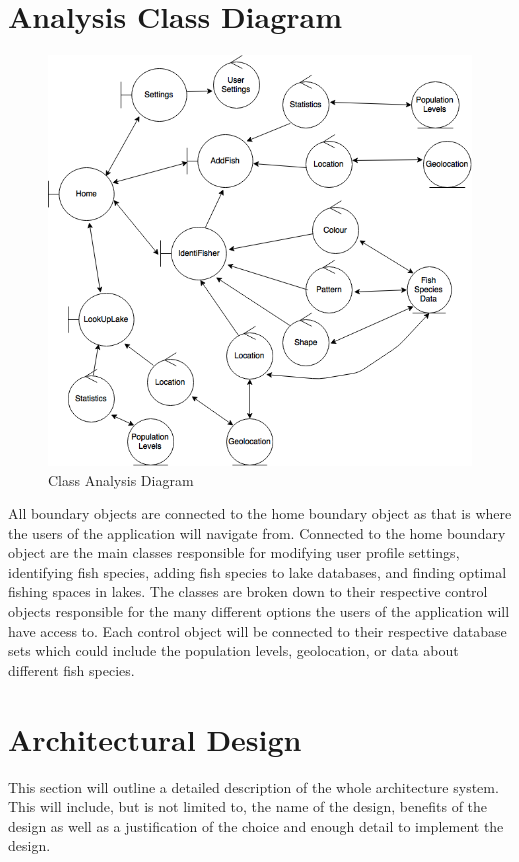 \documentclass[]{article}
\begin{document}
\section{Analysis Class Diagram}
\label{sec:analysis_class_diagram}
\begin{figure}
\includegraphics[width=\textwidth]{classAnalysis}
\caption{Class Analysis Diagram}
\end{figure}

\FloatBarrier

All boundary objects are connected to the home boundary object as that is where the users of the application will navigate from. Connected to the home boundary object are the main classes responsible for modifying user profile settings, identifying fish species, adding fish species to lake databases, and finding optimal fishing spaces in lakes. The classes are broken down to their respective control objects responsible for the many different options the users of the application will have access to. Each control object will be connected to their respective database sets which could include the population levels, geolocation, or data about different fish species.

\section{Architectural Design}
\label{sec:architectural_design}
This section will outline a detailed description of the whole architecture system. This will include, but is not limited to, the name of the design, benefits of the design as well as a justification of the choice and enough detail to implement the design.
\end{document}
